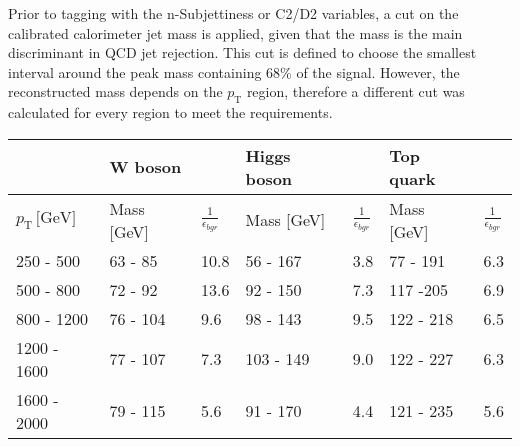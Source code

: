 Prior to tagging with the n-Subjettiness or C2/D2 variables, a cut on the calibrated calorimeter jet mass is applied, given that the mass is the main discriminant in QCD jet rejection. This cut is defined to choose the smallest interval around the peak mass containing 68\% of the signal. However, the reconstructed mass depends on the $p_{\mathrm{T}}$ region, therefore a different cut was calculated for every region to meet the requirements.
\begin{table}[]
\centering
\begin{tabular}{l||ll||ll||ll}
  &  \textbf{W boson}                                                    &                                 &  \textbf{Higgs boson}                                  &                                &    \textbf{Top quark}                                  &                                  \\ \hline
$p_{\mathrm{T}} \, \text{[GeV]}$   & \multicolumn{1}{l|}{Mass [GeV]} & $\frac{1}{\epsilon_{bgr}}$ & \multicolumn{1}{l|}{Mass [GeV]} & $\frac{1}{\epsilon_{bgr}}$ & \multicolumn{1}{l|}{Mass [GeV]}  & $\frac{1}{\epsilon_{bgr}}$ \\ \hline \hline
250 - 500 & \multicolumn{1}{l|}{63 - 85}                        & 10.8                            & \multicolumn{1}{l|}{56 - 167}          & 3.8                             & \multicolumn{1}{l|}{77 - 191}          & 6.3                             \\ \cline{1-7} 
500 - 800 & \multicolumn{1}{l|}{72 - 92}                        & 13.6                            & \multicolumn{1}{l|}{92 - 150}          & 7.3                             & \multicolumn{1}{l|}{117 -205}          & 6.9                             \\ \cline{1-7} 
800 - 1200 & \multicolumn{1}{l|}{76 - 104}                       & 9.6                             & \multicolumn{1}{l|}{98 - 143}          & 9.5                             & \multicolumn{1}{l|}{122 - 218}         & 6.5                             \\ \cline{1-7} 
1200 - 1600 & \multicolumn{1}{l|}{77 - 107}                       & 7.3                             & \multicolumn{1}{l|}{103 - 149}         & 9.0                             & \multicolumn{1}{l|}{122 - 227}         & 6.3                             \\ \cline{1-7} 
1600 - 2000 & \multicolumn{1}{l|}{79 - 115}                       & 5.6                             & \multicolumn{1}{l|}{91 - 170}          & 4.4                             & \multicolumn{1}{l|}{121 - 235}         & 5.6                             \\ \cline{1-7} 

\end{tabular}
\end{table}
